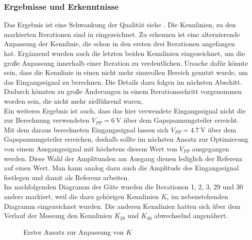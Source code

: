 \documentclass[../Report.tex]{subfiles}
\begin{document}
\subsubsection*{Ergebnisse und Erkenntnisse}
\label{subsubsec:opt.adjusta.results}
Das Ergebnis ist eine Schwankung der Qualität siehe . Die Kennlinien, zu den markierten Iterationen sind in  eingezeichnet. Zu erkennen ist eine alternierende Anpassung der Kennlinie, die schon in den ersten drei Iterationen angefangen hat. Ergänzend wurden auch die letzten beiden Kennlinien eingezeichnet, um die große Anpassung innerhalb einer Iteration zu verdeutlichen. Ursache dafür könnte sein, dass die Kennlinie in einen nicht mehr sinnvollen Bereich genutzt wurde, um das Eingangssignal zu berechnen. Die Details dazu folgen im nächsten Abschitt. Dadurch könnten zu große Änderungen in einem Iterationsschritt vorgenommen worden sein, die nicht mehr zielführend waren.\\
Ein weiteres Ergebnis ist auch, dass das hier verwendete Eingangssignal nicht die zur Berechnung verwendeten $V_{PP} = \SI{6}{\V}$ über dem Gapspannungsteiler erreicht. Mit dem daraus berechneten Eingangssignal lassen sich $V_{PP} = \SI{4,7}{\V}$ über dem Gapspannungsteiler erreichen, deshalb sollte im nächsten Ansatz zur Optimierung von einem Ausgangssignal mit höchstens diesem Wert von $V_{PP}$ ausgegangen werden. Diese Wahl der Amplitunden am Ausgang dienen lediglich der Referenz auf einen Wert. Man kann analog dazu auch die Amplitude des Eingangssignal festlegen und damit als Referenz arbeiten.\\
Im nachfolgenden Diagramm der Güte wurden die Iterationen 1, 2, 3, 29 und 30 anders markiert, weil die dazu gehörigen Kennlinien $K_i$ im nebenstehenden Diagramm eingezeichnet wurden. Die anderen Kennlinien hatten sich über dem Verlauf der Messung den Kennlinien $K_{29}$ und $K_{30}$ abwechselnd angenähert.
\begin{figure}[H]
\begin{subfigure}{0.5 \textwidth}
    \newlength\figureheight
	\newlength\figurewidth
	\setlength\figureheight{7.5cm}
	\setlength\figurewidth{7.5cm}
    
	\label{fig:evaluate30K}
\end{subfigure}
\begin{subfigure}{0.5 \textwidth}
	\setlength\figureheight{7.5cm}
	\setlength\figurewidth{7.5cm}
    
	\label{fig:evaluate30Q}
\end{subfigure}
\label{fig:opt.evaluate30}
\caption{Erster Ansatz zur Anpassung von $K$}
\end{figure}
\end{document}
